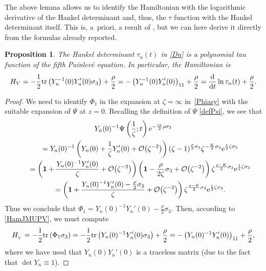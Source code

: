 \documentclass[pdftex]{sigma}
\numberwithin{equation}{section}
\newtheorem{Proposition}[Theorem]{Proposition}
\theoremstyle{definition}
\def\tr{{\rm tr}}
\def\le{\left}
\def\ri{\right}
\def \d{{\mathrm d}}
\def \1{\mathbf 1}
\def\s{\sigma}
\begin{document}
The above lemma allows us to identify the Hamiltonian with the logarithmic derivative of the Hankel determinant and, thus, the $\tau$ function with the Hankel determinant itself. This is, a~priori, a result of \cite{Bertola:Semiiso}, but we can here derive it directly from the formulas already reported.
\begin{Proposition}\label{tauPV}
The Hankel determinant $\tau_n(t)$ in \eqref{Dn} is a polynomial tau function of the fifth Painlev\'e equation. In particular, the Hamiltonian is
\[
H_V = -\frac 1 2 \tr \le(Y_n^{-1}(0) Y'_n(0) \s_3\ri) + \frac { {\rho}} 2 =-
\le(Y_n^{-1}(0) Y'_n(0) \ri)_{11} + \frac { {\rho}} 2 = \frac {\d}{\d t} \ln \tau_n(t) + \frac { {\rho}} 2.
\]
\end{Proposition}
\begin{proof}
We need to identify $\Phi_1$ in the expansion at $\zeta=\infty$ in~\eqref{Phiasy} with the suitable expansion of $\Psi$ at $z=0$. Recalling the definition of $\Psi $ \eqref{defPsi}, we see that
\begin{gather*}
Y_n(0)^{-1}\Psi\le(\frac 1 \zeta;t\ri) {\rm e}^{-\frac {{\rm i}\pi}2 { {\rho}} \s_3}\\
\qquad
=
 Y_n(0)^{-1}\le(Y_n(0) + \frac 1 \zeta Y_n'(0) + \mathcal O\bigl(\zeta^{-2}\bigr)\ri)
(\zeta-1)^{\frac { {\rho}} 2 \s_3} \zeta ^{-\frac { {K}} 2 \s_3} {\rm e}^{\frac t 2 \zeta \s_3}\\
\qquad=\le(\1 + \frac {Y_n(0)^{-1} Y_n'(0)}\zeta + \mathcal O\bigl(\zeta ^{-2}\bigr)\ri)
 \le( \1 - \frac {{ {\rho}}}{2\zeta}\s_3 + \mathcal O\bigl(\zeta ^{-2}\bigr)\ri)
 \zeta^{\frac {{ {\rho}}-{ {K}}}2\s_3}
 {\rm e}^{\frac t 2 \zeta \s_3}\\
\qquad=\le(\1 + \frac { Y_n(0)^{-1} Y_n'(0) - \frac { {\rho}} 2\s_3}\zeta + \mathcal O\bigl(\zeta ^{-2}\bigr)\ri) \zeta^{\frac {{ {\rho}}-{ {K}}}2\s_3} {\rm e}^{\frac t 2 \zeta \s_3}.
\end{gather*}
Thus we conclude that
$
\Phi_1 = Y_n(0)^{-1} Y_n'(0) - \frac { {\rho}} 2\s_3$.
Then, according to \eqref{HamJMUPV}, we must compute
\[
H_{_V}=-\frac 1 2 \tr \le(\Phi_1\s_3\ri) = -\frac 1 2 \tr \le( Y_n(0)^{-1} Y_n'(0) \s_3\ri) + \frac { {\rho}} 2
=-\le( Y_n(0)^{-1} Y_n'(0) \ri) _{11} + \frac { {\rho}} 2,
\]
where we have used that $Y_n(0)Y_n'(0)$ is a traceless matrix (due to the fact that $\det Y_n \equiv 1$).


\end{proof}
\end{document}
